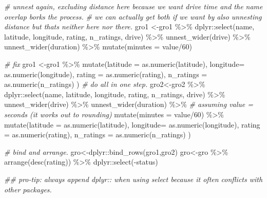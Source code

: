 \documentclass[]{tufte-handout}
\newenvironment{Shaded}{}{}
\newcommand{\AttributeTok}[1]{\textcolor[rgb]{0.49,0.56,0.16}{#1}}
\newcommand{\CommentTok}[1]{\textcolor[rgb]{0.38,0.63,0.69}{\textit{#1}}}
\newcommand{\DecValTok}[1]{\textcolor[rgb]{0.25,0.63,0.44}{#1}}
\newcommand{\DocumentationTok}[1]{\textcolor[rgb]{0.73,0.13,0.13}{\textit{#1}}}
\newcommand{\FunctionTok}[1]{\textcolor[rgb]{0.02,0.16,0.49}{#1}}
\newcommand{\NormalTok}[1]{#1}
\newcommand{\OtherTok}[1]{\textcolor[rgb]{0.00,0.44,0.13}{#1}}
\newcommand{\SpecialCharTok}[1]{\textcolor[rgb]{0.25,0.44,0.63}{#1}}
\begin{document}
\begin{Shaded}
\begin{Highlighting}[]
\CommentTok{\# unnest again, excluding distance here because we want drive time and the name overlap borks the process. }
\CommentTok{\# we can actually get both if we want by also unnesting distance but that\textquotesingle{}s neither here nor there. }
\NormalTok{gro1 }\OtherTok{\textless{}{-}}\NormalTok{gro1 }\SpecialCharTok{\%\textgreater{}\%} 
\NormalTok{  dplyr}\SpecialCharTok{::}\FunctionTok{select}\NormalTok{(name, latitude, longitude, rating, n\_ratings, drive) }\SpecialCharTok{\%\textgreater{}\%} 
  \FunctionTok{unnest\_wider}\NormalTok{(drive) }\SpecialCharTok{\%\textgreater{}\%} 
  \FunctionTok{unnest\_wider}\NormalTok{(duration) }\SpecialCharTok{\%\textgreater{}\%} 
  \FunctionTok{mutate}\NormalTok{(}\AttributeTok{minutes =}\NormalTok{ value}\SpecialCharTok{/}\DecValTok{60}\NormalTok{)}

\CommentTok{\# fix}
\NormalTok{gro1 }\OtherTok{\textless{}{-}}\NormalTok{gro1 }\SpecialCharTok{\%\textgreater{}\%} 
  \FunctionTok{mutate}\NormalTok{(}\AttributeTok{latitude =} \FunctionTok{as.numeric}\NormalTok{(latitude),}
         \AttributeTok{longitude=} \FunctionTok{as.numeric}\NormalTok{(longitude),}
         \AttributeTok{rating =} \FunctionTok{as.numeric}\NormalTok{(rating),}
         \AttributeTok{n\_ratings =} \FunctionTok{as.numeric}\NormalTok{(n\_ratings)}
\NormalTok{  )}
\CommentTok{\# do all in one step. }
\NormalTok{gro2}\OtherTok{\textless{}{-}}\NormalTok{gro2 }\SpecialCharTok{\%\textgreater{}\%} 
\NormalTok{  dplyr}\SpecialCharTok{::}\FunctionTok{select}\NormalTok{(name, latitude, longitude, rating, n\_ratings, drive) }\SpecialCharTok{\%\textgreater{}\%} 
  \FunctionTok{unnest\_wider}\NormalTok{(drive) }\SpecialCharTok{\%\textgreater{}\%} 
  \FunctionTok{unnest\_wider}\NormalTok{(duration) }\SpecialCharTok{\%\textgreater{}\%} 
  \CommentTok{\# assuming value = seconds (it works out to rounding)}
  \FunctionTok{mutate}\NormalTok{(}\AttributeTok{minutes =}\NormalTok{ value}\SpecialCharTok{/}\DecValTok{60}\NormalTok{) }\SpecialCharTok{\%\textgreater{}\%} 
  \FunctionTok{mutate}\NormalTok{(}\AttributeTok{latitude =} \FunctionTok{as.numeric}\NormalTok{(latitude),}
         \AttributeTok{longitude=} \FunctionTok{as.numeric}\NormalTok{(longitude),}
         \AttributeTok{rating =} \FunctionTok{as.numeric}\NormalTok{(rating),}
         \AttributeTok{n\_ratings =} \FunctionTok{as.numeric}\NormalTok{(n\_ratings)}
\NormalTok{  )}

\CommentTok{\# bind and arrange. }
\NormalTok{gro}\OtherTok{\textless{}{-}}\NormalTok{dplyr}\SpecialCharTok{::}\FunctionTok{bind\_rows}\NormalTok{(gro1,gro2)}
\NormalTok{gro}\OtherTok{\textless{}{-}}\NormalTok{gro }\SpecialCharTok{\%\textgreater{}\%} 
  \FunctionTok{arrange}\NormalTok{(}\FunctionTok{desc}\NormalTok{(rating)) }\SpecialCharTok{\%\textgreater{}\%} 
\NormalTok{  dplyr}\SpecialCharTok{::}\FunctionTok{select}\NormalTok{(}\SpecialCharTok{{-}}\NormalTok{status)}

\DocumentationTok{\#\# pro{-}tip: always append dplyr:: when using select because it often conflicts with other packages.}
\end{Highlighting}
\end{Shaded}
\end{document}
